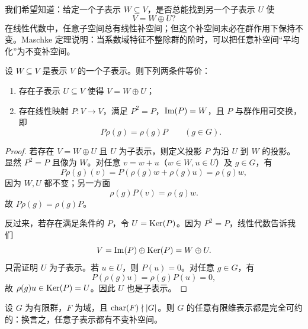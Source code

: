 我们希望知道：给定一个子表示 $W\subseteq V$，是否总能找到另一个子表示 $U$ 使
\[
V=W\oplus U?
\]
在线性代数中，任意子空间总有线性补空间；但这个补空间未必在群作用下保持不变。Maschke 定理说明：当系数域特征不整除群的阶时，可以把任意补空间“平均化”为不变补空间。

\begin{proposition}
设 $W\subseteq V$ 是表示 $V$ 的一个子表示。则下列两条件等价：
\begin{enumerate}[label=\textnormal{(\arabic*)}]
  \item 存在子表示 $U\subseteq V$ 使得 $V=W\oplus U$；
  \item 存在线性映射 $P:V\to V$，满足 $P^2=P$，$\mathrm{Im}(P)=W$，且 $P$ 与群作用可交换，即
  \[
  P\rho(g)=\rho(g)P\qquad (g\in G).
  \]
\end{enumerate}
\end{proposition}

\begin{proof}
若存在 $V=W\oplus U$ 且 $U$ 为子表示，则定义投影 $P$ 为沿 $U$ 到 $W$ 的投影。显然 $P^2=P$ 且像为 $W$。对任意 $v=w+u$（$w\in W,u\in U$）及 $g\in G$，有
\[
P\rho(g)(v)=P(\rho(g)w+\rho(g)u)=\rho(g)w,
\]
因为 $W,U$ 都不变；另一方面
\[
\rho(g)P(v)=\rho(g)w.
\]
故 $P\rho(g)=\rho(g)P$。

反过来，若存在满足条件的 $P$，令 $U=\mathrm{Ker}(P)$。因为 $P^2=P$，线性代数告诉我们
\[
V=\mathrm{Im}(P)\oplus \mathrm{Ker}(P)=W\oplus U.
\]
只需证明 $U$ 为子表示。若 $u\in U$，则 $P(u)=0$。对任意 $g\in G$，有
\[
P(\rho(g)u)=\rho(g)P(u)=0,
\]
故 $\rho(g)u\in \mathrm{Ker}(P)=U$。因此 $U$ 也是子表示。
\end{proof}

\begin{theorem}[Maschke 定理]
设 $G$ 为有限群，$F$ 为域，且 $\mathrm{char}(F)\nmid |G|$。则 $G$ 的任意有限维表示都是完全可约的：换言之，任意子表示都有不变补空间。
\end{theorem}

